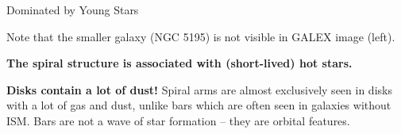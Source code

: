 \documentclass[letterpaper,landscape]{slides}
\begin{document}
%
%
%
%
%
%
%





\begin{slide}

\begin{center}
   {\large \color{red} Dominated by Young Stars}
\end{center}

\begin{center}

\end{center}

Note that the smaller galaxy (NGC 5195) is not visible in GALEX
image (left). 

{\bf \color{blue}  The spiral structure is associated with (short-lived) hot stars.}
 
\vfill
\end{slide}
%








\begin{slide}

\begin{center}
\end{center}

{\bf \color{blue}  Disks contain a lot of dust!} Spiral arms are almost exclusively
seen in disks with a lot of gas and dust, unlike bars which are often seen
in galaxies without ISM. {\color{blue} Bars are not a wave of star formation -- they are
orbital features.}
 
\vfill
\end{slide}
\end{document}
